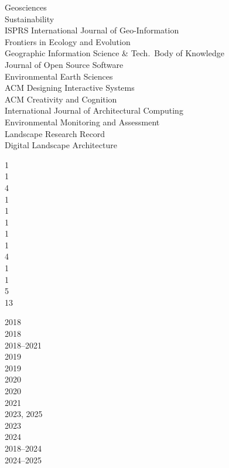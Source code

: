 \documentclass[10pt]{designcv}
\begin{document}

\begin{minipage}[t]{0.65\textwidth}
Geosciences\\
Sustainability\\
ISPRS International Journal of Geo-Information\\
Frontiers in Ecology and Evolution\\
Geographic Information Science \& Tech.~Body of Knowledge\\
Journal of Open Source Software\\
Environmental Earth Sciences\\
ACM Designing Interactive Systems\\
ACM Creativity and Cognition\\
International Journal of Architectural Computing\\
Environmental Monitoring and Assessment\\
Landscape Research Record\\
Digital Landscape Architecture\\
\end{minipage}
\hfill
\begin{minipage}[t]{0.05\textwidth}
1\\
1\\
4\\
1\\
1\\
1\\
1\\
1\\
4\\
1\\
1\\
5\\
13\\
\end{minipage}
\hfill
\begin{minipage}[t]{0.15\textwidth}
2018\\
2018\\
2018--2021\\
2019\\
2019\\
2020\\
2020\\
2021\\
2023, 2025\\
2023\\
2024\\
2018--2024\\
2024--2025\\
\end{minipage}
\end{document}
